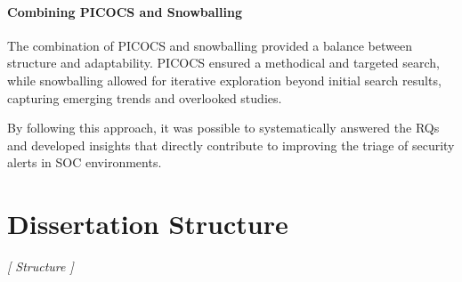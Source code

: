 \paragraph{Combining PICOCS and Snowballing} The combination of PICOCS and snowballing provided a balance between structure and adaptability. 
PICOCS ensured a methodical and targeted search, while snowballing allowed for iterative exploration beyond initial search results, capturing emerging trends and overlooked studies.

By following this approach, it was possible to systematically answered the RQs and developed insights that directly contribute to improving the triage of security alerts in SOC environments.






\section{Dissertation Structure}

\textit{
    [ 
        Structure
    ]
}

%